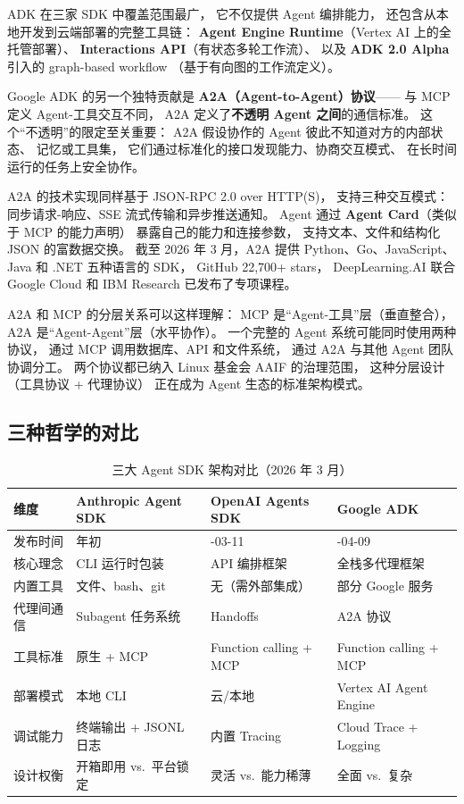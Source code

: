 ADK 在三家 SDK 中覆盖范围最广，
它不仅提供 Agent 编排能力，
还包含从本地开发到云端部署的完整工具链：
\textbf{Agent Engine Runtime}（Vertex AI 上的全托管部署）、
\textbf{Interactions API}（有状态多轮工作流）、
以及 \textbf{ADK 2.0 Alpha} 引入的 graph-based workflow
（基于有向图的工作流定义）。

Google ADK 的另一个独特贡献是
\textbf{A2A（Agent-to-Agent）协议}——
与 MCP 定义 Agent-工具交互不同，
A2A 定义了\textbf{不透明 Agent 之间}的通信标准。
这个“不透明”的限定至关重要：
A2A 假设协作的 Agent 彼此不知道对方的内部状态、
记忆或工具集，
它们通过标准化的接口发现能力、协商交互模式、
在长时间运行的任务上安全协作。

A2A 的技术实现同样基于 JSON-RPC 2.0 over HTTP(S)，
支持三种交互模式：
同步请求-响应、SSE 流式传输和异步推送通知。
Agent 通过 \textbf{Agent Card}（类似于 MCP 的能力声明）
暴露自己的能力和连接参数，
支持文本、文件和结构化 JSON 的富数据交换。
截至 2026 年 3 月，A2A 提供 Python、Go、JavaScript、
Java 和 .NET 五种语言的 SDK，
GitHub 22,700+ stars，
DeepLearning.AI 联合 Google Cloud 和 IBM Research
已发布了专项课程。

A2A 和 MCP 的分层关系可以这样理解：
MCP 是“Agent-工具”层（垂直整合），
A2A 是“Agent-Agent”层（水平协作）。
一个完整的 Agent 系统可能同时使用两种协议，
通过 MCP 调用数据库、API 和文件系统，
通过 A2A 与其他 Agent 团队协调分工。
两个协议都已纳入 Linux 基金会 AAIF 的治理范围，
这种分层设计（工具协议 + 代理协议）
正在成为 Agent 生态的标准架构模式。

\subsection{三种哲学的对比}

\begin{table}[H]
\centering\small
\renewcommand{\arraystretch}{1.3}
\caption{三大 Agent SDK 架构对比（2026 年 3 月）}\label{tab:agent-sdk-comparison}
\begin{tabularx}{\linewidth}{l >{\raggedright\arraybackslash}X >{\raggedright\arraybackslash}X >{\raggedright\arraybackslash}X}
\toprule
\rowcolor{figLightGray}
\textbf{维度} & \textbf{Anthropic Agent SDK} & \textbf{OpenAI Agents SDK} & \textbf{Google ADK} \\
\midrule
发布时间 & 2026 年初 & 2025-03-11 & 2025-04-09 \\
核心理念 & CLI 运行时包装 & API 编排框架 & 全栈多代理框架 \\
内置工具 & 文件、bash、git & 无（需外部集成） & 部分 Google 服务 \\
代理间通信 & Subagent 任务系统 & Handoffs & A2A 协议 \\
工具标准 & 原生 + MCP & Function calling + MCP & Function calling + MCP \\
部署模式 & 本地 CLI & 云/本地 & Vertex AI Agent Engine \\
调试能力 & 终端输出 + JSONL 日志 & 内置 Tracing & Cloud Trace + Logging \\
设计权衡 & 开箱即用 vs.\ 平台锁定 & 灵活 vs.\ 能力稀薄 & 全面 vs.\ 复杂 \\
\bottomrule
\end{tabularx}
\end{table}

